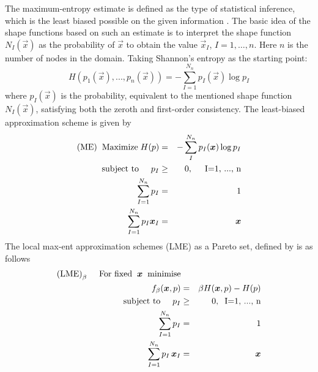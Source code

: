The maximum-entropy estimate is defined as the type of statistical
inference, which is the least biased possible on the given information
\cite{Jaynes1957}. The basic idea of the shape functions based on such an estimate is to interpret the shape function $N_I(\vec{x})$ as the probability of $\vec{x}$ to obtain the value $\vec{x}_I$,  $I=1, \dots, n$. Here $n$ is the number of nodes in the domain. Taking Shannon's entropy as the starting point:
\begin{equation}
  \label{eq:Shannon-entropy}
  H(p_1(\vec{x}),...,p_n(\vec{x})) = -\sum^{N_n}_{I=1}{p_I(\vec{x})\log p_I }
\end{equation}
where $p_I(\vec{x})$ is the probability, equivalent to the mentioned
shape function $N_I(\vec{x})$,  satisfying both the zeroth and
first-order consistency. The least-biased approximation scheme is given by
\begin{eqnarray}
  \text{(ME)} \hspace{0.2cm} \text{Maximize} \hspace{0.1cm}H(p) &=&  -\sum_{I}^{N_n}{p_I(\vec{x})\log p_I } \nonumber \\
  \text{subject to} \hspace{0.5cm} p_I &\ge& 0, \hspace{0.5cm} \text{I=1, ..., n} \nonumber \\
  \sum_{I=1}^{N_n}{p_I} &=& 1 \nonumber \\
  \sum_{I=1}^{N_n}{p_I \vec{x}_I} &=& \vec{x} \nonumber 
\end{eqnarray}
The local max-ent approximation schemes (LME) as a Pareto set,
defined by \cite{Arroyo2006} is as follows 
\begin{eqnarray}
  \text{(LME)}_{\beta} \hspace{0.5cm} \text{For fixed} \hspace{0.2cm} \vec{x} \hspace{0.2cm} \text{minimise}  \nonumber \\
  \hspace{0.5cm}f_{\beta}(\vec{x}, p) &=& \beta H(\vec{x},p) - H(p)  \nonumber  \\
  \text{subject to} \hspace{0.5cm} p_I &\ge& 0, \hspace{0.2cm} \text{I=1, ..., n}  \nonumber \\
  \sum_{I=1}^{N_n}{p_I} &=& 1  \nonumber \\
  \sum_{I=1}^{N_n}{p_I \, \vec{x}_I} &=& \vec{x}    \nonumber 
\end{eqnarray}
